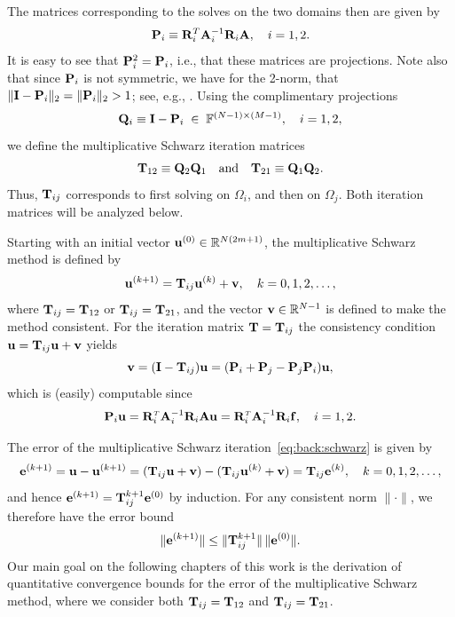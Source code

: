 The matrices corresponding to the solves on the two domains then are given by
%
\begin{equation}\label{eq:back:Pi}
\P_i\equiv \R_i^T\A_i^{-1}\R_i\A,\quad i=1,2.
\end{equation}
%
It is easy to see that $\P_i^2=\P_i$, i.e., that these matrices are projections.
Note also that since $\P_i$ is not symmetric, we have for the 2-norm,
that $\|\I-\P_i\|_2 = \|\P_i\|_2 > 1$; see, e.g., \cite{Szy06}. Using the
complimentary projections
%
$$\Q_i\equiv \I-\P_i\;\in\;\mathbb{F}^{(N-1)\times (M-1)},\quad i=1,2,$$
%
we define the multiplicative Schwarz iteration matrices
%
\begin{equation}\label{eq:back:Tij}
\T_{12}\equiv \Q_2\Q_1\quad\mbox{and}\quad \T_{21}\equiv \Q_1\Q_2.
\end{equation}
%
Thus, $\T_{ij}$ corresponds to first solving on $\Omega_i$, and then on
$\Omega_j$. Both iteration matrices will be analyzed below.

Starting with an initial vector $\u^{(0)}\in{\mathbb R}^{N(2m+ 1)}$,
the multiplicative Schwarz method is defined by
%
\begin{equation}\label{eq:back:schwarz}
\u^{(k+1)}=\T_{ij} \u^{(k)}+\vv, \quad k=0,1,2,\dots,
\end{equation}
%
where $\T_{ij}=\T_{12}$ or $\T_{ij}=\T_{21}$, and the vector
$\vv\in {\mathbb R}^{N-1}$ is defined to make the method consistent.
For the iteration matrix $\T=\T_{ij}$ the consistency condition
$\u=\T_{ij}\u+\vv$ yields
$$
\vv = (\I-\T_{ij})\u = (\P_i+\P_j-\P_j\P_i)\u,
$$
which is (easily) computable since
$$
\P_i\u=\R_i^{\Tr}\A_i^{-1}\R_i\A\u=\R_i^{\Tr}\A_i^{-1}\R_i\f,\quad i=1,2.
$$

The error of the multiplicative Schwarz iteration~\eqref{eq:back:schwarz} is
given by
\begin{equation}\label{eq:back:schwarz_err}
\e^{(k+1)}=\u-\u^{(k+1)}=(\T_{ij}\u + \vv)- (\T_{ij} \u^{(k)}+\vv)=\T_{ij} \e^{(k)},
\quad k=0,1,2,\dots,
\end{equation}
and hence $\e^{(k+1)}=\T_{ij}^{k+1} \e^{(0)}$ by induction.
For any consistent norm $\|\cdot\|$, we therefore have the error bound
%
\begin{equation}\label{eq:back:error}
\|\e^{(k+1)}\|\leq \|\T_{ij}^{k+1}\|\,\|\e^{(0)}\|.
\end{equation}
%
Our main goal on the following chapters of this work is the derivation of
quantitative convergence bounds for the error of the multiplicative Schwarz method, where we consider both
$\T_{ij}=\T_{12}$ and $\T_{ij}=\T_{21}$.

